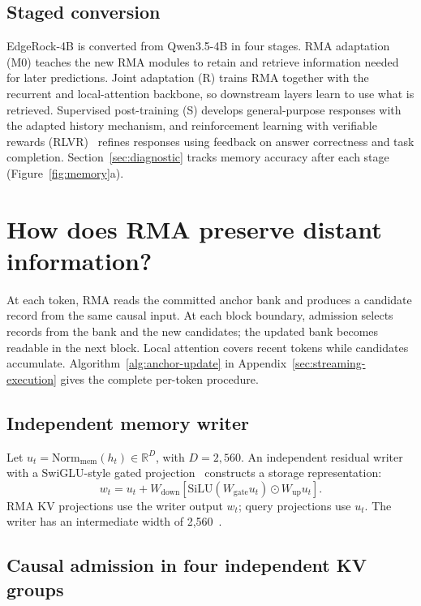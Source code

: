 \FloatBarrier
\subsection{Staged conversion}
\label{sec:training}
EdgeRock-4B is converted from Qwen3.5-4B in four stages. RMA adaptation (M0) teaches the new RMA modules to retain and retrieve information needed for later predictions. Joint adaptation (R) trains RMA together with the recurrent and local-attention backbone, so downstream layers learn to use what is retrieved. Supervised post-training (S) develops general-purpose responses with the adapted history mechanism, and reinforcement learning with verifiable rewards (RLVR)~\cite{tulu3,deepseekr1} refines responses using feedback on answer correctness and task completion. Section~\ref{sec:diagnostic} tracks memory accuracy after each stage (Figure~\ref{fig:memory}a).

\section{How does RMA preserve distant information?}
\label{sec:memory-algorithm}

At each token, RMA reads the committed anchor bank and produces a candidate record from the same causal input. At each block boundary, admission selects records from the bank and the new candidates; the updated bank becomes readable in the next block. Local attention covers recent tokens while candidates accumulate. Algorithm~\ref{alg:anchor-update} in Appendix~\ref{sec:streaming-execution} gives the complete per-token procedure.

\subsection{Independent memory writer}
\label{sec:write}

Let $u_t=\mathrm{Norm}_{\mathrm{mem}}(h_t)\in\mathbb R^D$, with $D=2{,}560$. An independent residual writer with a SwiGLU-style gated projection~\cite{glu} constructs a storage representation:
\begin{equation}
w_t = u_t+W_{\mathrm{down}}\!\left[\mathrm{SiLU}(W_{\mathrm{gate}}u_t)\odot W_{\mathrm{up}}u_t\right].
\end{equation}
RMA KV projections use the writer output $w_t$; query projections use $u_t$. The writer has an intermediate width of 2,560~\cite{yanchorcode,yanchorconfig}.

\subsection{Causal admission in four independent KV groups}

